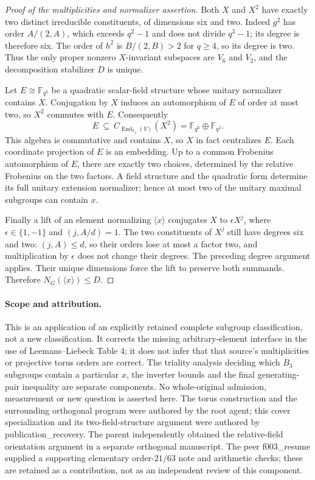 \documentclass[11pt]{article}
\newcommand{\F}{\mathbb F}\newcommand{\Om}{\Omega}\newcommand{\PGU}{\operatorname{PGU}}\newcommand{\GL}{\operatorname{GL}}\newcommand{\End}{\operatorname{End}}\newcommand{\PSU}{\operatorname{PSU}}
\begin{document}
\begin{proof}[Proof of the multiplicities and normalizer assertion]
Both $X$ and $X^2$ have exactly two distinct irreducible constituents, of
dimensions six and two. Indeed $g^2$ has order $A/(2,A)$, which exceeds
$q^2-1$ and does not divide $q^3-1$; its degree is therefore six.
The order of $h^2$ is $B/(2,B)>2$ for $q\ge4$, so its degree is two.
Thus the only proper nonzero $X$-invariant subspaces are $V_6$ and $V_2$,
and the decomposition stabilizer $D$ is unique.

Let $E\cong\F_{q^2}$ be a quadratic scalar-field structure whose unitary
normalizer contains $X$. Conjugation by $X$ induces an automorphism of
$E$ of order at most two, so $X^2$ commutes with $E$. Consequently
\[
 E\ \subseteq\ C_{\End_{\F_q}(V)}(X^2)
       =\F_{q^6}\oplus\F_{q^2}.
\]
This algebra is commutative and contains $X$, so $X$ in fact centralizes
$E$. Each coordinate projection of $E$ is an embedding. Up to a common
Frobenius automorphism of $E$, there are exactly two choices, determined
by the relative Frobenius on the two factors. A field structure and the
quadratic form determine its full unitary extension normalizer; hence
at most two of the unitary maximal subgroups can contain $x$.

Finally a lift of an element normalizing $\langle x\rangle$ conjugates
$X$ to $\epsilon X^j$, where $\epsilon\in\{1,-1\}$ and
$(j,A/d)=1$. The two constituents of $X^j$ still have degrees six and two:
$(j,A)\le d$, so their orders lose at most a factor two, and multiplication
by $\epsilon$ does not change their degrees. The preceding degree argument
applies. Their unique dimensions force the lift to preserve both summands.
Therefore $N_G(\langle x\rangle)\le D$.
\end{proof}

\paragraph{Scope and attribution.}
This is an application of an explicitly retained complete subgroup
classification, not a new classification. It corrects the missing arbitrary-element
interface in the use of Leemans--Liebeck Table 4; it does not infer that
that source's multiplicities or projective torus orders are correct.
The triality analysis deciding which $B_3$ subgroups contain a particular
$x$, the inverter bounds and the final generating-pair inequality are
separate components. No whole-original admission, measurement or new
question is asserted here. The torus construction and the surrounding
orthogonal program were authored by the root agent; this cover specialization
and its two-field-structure argument were authored by publication\_recovery.
The parent independently obtained the relative-field orientation argument
in a separate orthogonal manuscript. The peer f003\_resume supplied a
supporting elementary order-$21/63$ note and arithmetic checks; these are
retained as a contribution, not as an independent review of this component.
\end{document}
